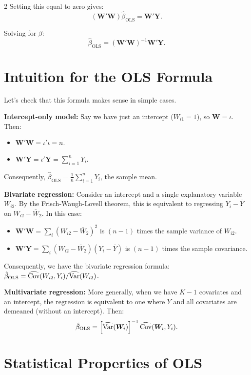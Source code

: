 \documentclass[12pt]{article}
\begin{document}
\begin{multicols}{2}
  Setting this equal to zero gives:
  $$
  \left(\bm{W}' \bm{W} \right) \hat{\beta}_{\text{OLS}} = \bm{W}' \bm{Y}.
  $$

  Solving for $\beta$:
  $$
  \hat{\beta}_{\text{OLS}} = \left(\bm{W}' \bm{W} \right)^{-1} \bm{W}' \bm{Y}.
  $$

  \section*{Intuition for the OLS Formula}

  Let's check that this formula makes sense in simple cases.

  \noindent\textbf{Intercept-only model:} Say we have just an intercept ($W_{i1} = 1$), so $\bm{W} = \iota$. Then:
  \begin{itemize}
    \item $\bm{W}' \bm{W} = \iota' \iota = n$.
    \item $\bm{W}' \bm{Y} = \iota' \bm{Y} = \sum_{i=1}^n Y_i$.
  \end{itemize}
  Consequently, $\hat{\beta}_{\text{OLS}} = \frac{1}{n} \sum_{i=1}^n Y_i$, the sample mean.

  \noindent\textbf{Bivariate regression:} Consider an intercept and a single explanatory variable $W_{i2}$.
  By the Frisch-Waugh-Lovell theorem, this is equivalent to regressing $Y_i - \bar{Y}$ on $W_{i2} - \bar{W}_2$.
  In this case:
  \begin{itemize}
    \item $\bm{W}' \bm{W} = \sum_i (W_{i2} - \bar{W}_2)^2$ is $(n-1)$ times the sample variance of $W_{i2}$.
    \item $\bm{W}' \bm{Y} = \sum_i (W_{i2} - \bar{W}_2)(Y_i - \bar{Y})$ is $(n-1)$ times the sample covariance.
  \end{itemize}

  Consequently, we have the bivariate regression formula: $\hat{\beta}_{\text{OLS}} = \widehat{\cov}(W_{i2}, Y_i) / \widehat{\var}(W_{i2})$.

  \noindent\textbf{Multivariate regression:} More generally, when we have $K-1$ covariates and an intercept, the regression is equivalent to one where $Y$ and all covariates are demeaned (without an intercept).
  Then:
  $$
  \hat{\beta}_{\text{OLS}} = \left[ \widehat{\var}(\bm{W}_i) \right]^{-1} \widehat{\cov}(\bm{W}_i, Y_i).
  $$

  \section*{Statistical Properties of OLS}


\end{multicols}
\end{document}
